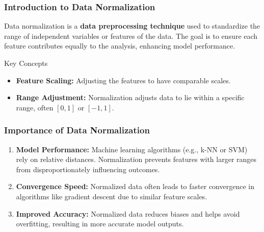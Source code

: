 \documentclass[aspectratio=169]{beamer}
\begin{document}
\begin{frame}[fragile]
    \frametitle{Introduction to Data Normalization}
    Data normalization is a \textbf{data preprocessing technique} used to standardize the range of independent variables or features of the data. The goal is to ensure each feature contributes equally to the analysis, enhancing model performance.
    
    \begin{block}{Key Concepts}
        \begin{itemize}
            \item \textbf{Feature Scaling:} Adjusting the features to have comparable scales.
            \item \textbf{Range Adjustment:} Normalization adjusts data to lie within a specific range, often \([0, 1]\) or \([-1, 1]\).
        \end{itemize}
    \end{block}
\end{frame}

\begin{frame}[fragile]
    \frametitle{Importance of Data Normalization}
    \begin{enumerate}
        \item \textbf{Model Performance:} Machine learning algorithms (e.g., k-NN or SVM) rely on relative distances. Normalization prevents features with larger ranges from disproportionately influencing outcomes.
        
        \item \textbf{Convergence Speed:} Normalized data often leads to faster convergence in algorithms like gradient descent due to similar feature scales.
        
        \item \textbf{Improved Accuracy:} Normalized data reduces biases and helps avoid overfitting, resulting in more accurate model outputs.
    \end{enumerate}
\end{frame}
\end{document}
